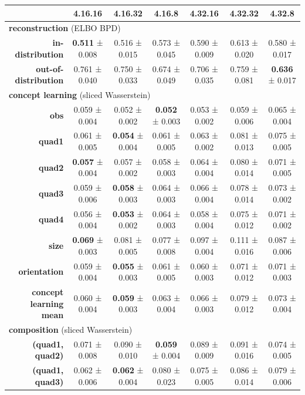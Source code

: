 \begin{tabular}{rcccccc}
\toprule
& \textbf{4.16.16} & \textbf{4.16.32} & \textbf{4.16.8} & \textbf{4.32.16} & \textbf{4.32.32} & \textbf{4.32.8} \\
\midrule
\multicolumn{ 7 }{l}{\textbf{reconstruction}  (ELBO BPD)} \\
\midrule
\textbf{in-distribution} & \textbf{0.511} ± 0.008 & 0.516 ± 0.015 & 0.573 ± 0.045 & 0.590 ± 0.009 & 0.613 ± 0.020 & 0.580 ± 0.017 \\
\textbf{out-of-distribution} & 0.761 ± 0.040 & 0.750 ± 0.033 & 0.674 ± 0.049 & 0.706 ± 0.035 & 0.759 ± 0.081 & \textbf{0.636} ± 0.017 \\
\midrule
\multicolumn{ 7 }{l}{\textbf{concept learning}  (sliced Wasserstein)} \\
\midrule
\textbf{obs} & 0.059 ± 0.004 & 0.052 ± 0.002 & \textbf{0.052} ± 0.003 & 0.053 ± 0.002 & 0.059 ± 0.006 & 0.065 ± 0.004 \\
\textbf{quad1} & 0.061 ± 0.005 & \textbf{0.054} ± 0.004 & 0.061 ± 0.005 & 0.063 ± 0.002 & 0.081 ± 0.013 & 0.075 ± 0.005 \\
\textbf{quad2} & \textbf{0.057} ± 0.004 & 0.057 ± 0.002 & 0.058 ± 0.003 & 0.064 ± 0.004 & 0.080 ± 0.014 & 0.071 ± 0.005 \\
\textbf{quad3} & 0.059 ± 0.006 & \textbf{0.058} ± 0.003 & 0.064 ± 0.003 & 0.066 ± 0.004 & 0.078 ± 0.014 & 0.073 ± 0.002 \\
\textbf{quad4} & 0.056 ± 0.004 & \textbf{0.053} ± 0.002 & 0.064 ± 0.003 & 0.058 ± 0.004 & 0.075 ± 0.012 & 0.071 ± 0.002 \\
\textbf{size} & \textbf{0.069} ± 0.003 & 0.081 ± 0.005 & 0.077 ± 0.008 & 0.097 ± 0.004 & 0.111 ± 0.016 & 0.087 ± 0.006 \\
\textbf{orientation} & 0.059 ± 0.004 & \textbf{0.055} ± 0.003 & 0.061 ± 0.005 & 0.060 ± 0.003 & 0.071 ± 0.012 & 0.071 ± 0.003 \\
\addlinespace
\textbf{concept learning mean} & 0.060 ± 0.004 & \textbf{0.059} ± 0.003 & 0.063 ± 0.004 & 0.066 ± 0.003 & 0.079 ± 0.012 & 0.073 ± 0.004 \\
\midrule
\multicolumn{ 7 }{l}{\textbf{composition}  (sliced Wasserstein)} \\
\midrule
\textbf{(quad1, quad2)} & 0.071 ± 0.008 & 0.090 ± 0.010 & \textbf{0.059} ± 0.004 & 0.089 ± 0.009 & 0.091 ± 0.016 & 0.074 ± 0.005 \\
\textbf{(quad1, quad3)} & 0.062 ± 0.006 & \textbf{0.062} ± 0.004 & 0.080 ± 0.023 & 0.075 ± 0.005 & 0.086 ± 0.014 & 0.079 ± 0.006 \\

\end{tabular}
